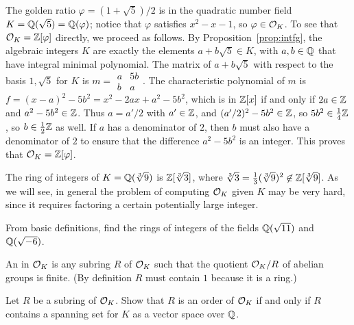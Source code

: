 \begin{example}\label{example:Qsqrt5ringofints}
  The golden ratio $\varphi =(1+\sqrt{5})/2$ is in the quadratic
  number field $K=\mathbb{Q}(\sqrt{5})=\mathbb{Q}(\varphi)$; notice that
  $\varphi$ satisfies $x^2-x-1$, so $\varphi\in\mathcal{O}_K$.
  To see that $\mathcal{O}_K = \mathbb{Z}[\varphi]$ directly, we proceed as follows.
  By Proposition~\ref{prop:intfg}, the algebraic integers $K$
  are exactly the elements $a+b\sqrt{5} \in K$, with $a,b\in\mathbb{Q}$
  that have integral minimal polynomial. The matrix of $a+b\sqrt{5}$
  with respect to the basis $1,\sqrt{5}$ for $K$ is
  $m=\begin{smallmatrix} a & 5b \\ b & a \end{smallmatrix}$.
  The characteristic polynomial of $m$ is
  $f = (x-a)^2 - 5b^2 = x^2 - 2ax + a^2 - 5b^2$, which is in $\mathbb{Z}[x]$
  if and only if $2a\in\mathbb{Z}$ and $a^2-5b^2\in\mathbb{Z}$. Thus $a=a'/2$ with
  $a'\in\mathbb{Z}$, and $(a'/2)^2 - 5b^2 \in\mathbb{Z}$, so $5b^2 \in \frac{1}{4}\mathbb{Z}$,
  so $b\in\frac{1}{2}\mathbb{Z}$ as well. If $a$ has a denominator of $2$,
  then $b$ must also have a denominator of $2$ to ensure that the
  difference $a^2-5b^2$ is an integer. This proves that
  $\mathcal{O}_K = \mathbb{Z}[\varphi]$.
\end{example}

\begin{example}
  The ring of integers of $K=\mathbb{Q}(\sqrt[3]{9})$ is $\mathbb{Z}[\sqrt[3]{3}]$,
  where $\sqrt[3]{3}=\frac{1}{3}(\sqrt[3]{9})^2 \not \in \mathbb{Z}[\sqrt[3]{9}]$.
  As we will see, in general the problem of computing $\mathcal{O}_K$ given $K$
  may be very hard, since it requires factoring a certain potentially
  large integer.
\end{example}

\begin{exercise}
  From basic definitions, find the rings of integers of the fields
  $\mathbb{Q}(\sqrt{11})$ and $\mathbb{Q}(\sqrt{-6})$.
\end{exercise}

\begin{definition}[Order]\label{defn:order}
  An  in $\mathcal{O}_K$ is any subring $R$ of $\mathcal{O}_K$ such that
  the quotient $\mathcal{O}_K/R$ of abelian groups is finite.
  (By definition $R$ must contain $1$ because it is a ring.)
\end{definition}

\begin{exercise}
  Let $R$ be a subring of $\mathcal{O}_K$. Show that $R$ is an order of $\mathcal{O}_K$
  if and only if $R$ contains a spanning set for $K$ as a vector space
  over $\mathbb{Q}$.
\end{exercise}

